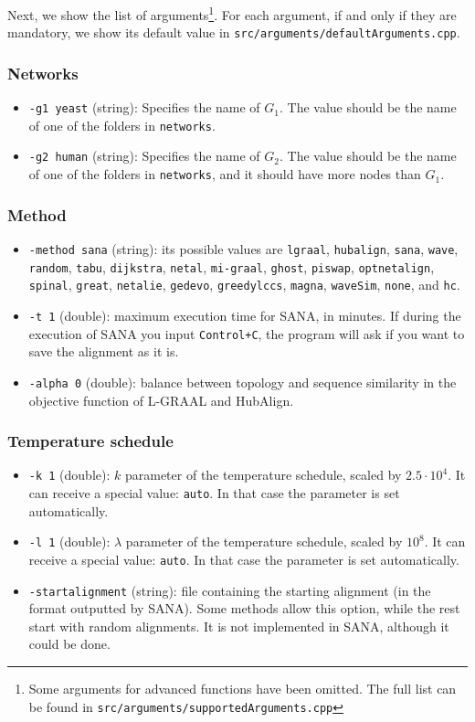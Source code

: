 \documentclass[]{article}
\begin{document}
Next, we show the list of arguments\footnote{Some arguments for advanced functions have been omitted. The full list can be found in \texttt{src/arguments/supportedArguments.cpp}}. For each argument, if and only if they are mandatory, we show its default value in \texttt{src/arguments/defaultArguments.cpp}.
\subsubsection*{Networks}
\begin{itemize}
\item\texttt{-g1 yeast} (string): Specifies the name of $G_1$. The value should be the name of one of the folders in \texttt{networks}.
\item\texttt{-g2 human} (string): Specifies the name of $G_2$. The value should be the name of one of the folders in \texttt{networks}, and it should have more nodes than $G_1$.
\end{itemize}
\subsubsection*{Method}
\begin{itemize}
\item\texttt{-method sana} (string): its possible values are \texttt{lgraal}, \texttt{hubalign}, \texttt{sana}, \texttt{wave}, \texttt{random}, \texttt{tabu}, \texttt{dijkstra}, \texttt{netal}, \texttt{mi-graal}, \texttt{ghost}, \texttt{piswap}, \texttt{optnetalign}, \texttt{spinal}, \texttt{great}, \texttt{netalie}, \texttt{gedevo}, \texttt{greedylccs}, \texttt{magna}, \texttt{waveSim}, \texttt{none}, and \texttt{hc}.
\item\texttt{-t 1} (double): maximum execution time for SANA, in minutes. If during the execution of SANA you input \texttt{Control+C}, the program will ask if you want to save the alignment as it is. 
\item\texttt{-alpha 0} (double): balance between topology and sequence similarity in the objective function of L-GRAAL and HubAlign.
\end{itemize}
\subsubsection*{Temperature schedule}
\begin{itemize}
\item\texttt{-k 1} (double): $k$ parameter of the temperature schedule, scaled by $2.5\cdot 10^{4}$. It can receive a special value: \texttt{auto}. In that case the parameter is set automatically.
\item\texttt{-l 1} (double): $\lambda$ parameter of the temperature schedule, scaled by $10^8$. It can receive a special value: \texttt{auto}. In that case the parameter is set automatically.
\item\texttt{-startalignment} (string): file containing the starting alignment (in the format outputted by SANA). Some methods allow this option, while the rest start with random alignments. It is not implemented in SANA, although it could be done.
\end{itemize}
\end{document}

